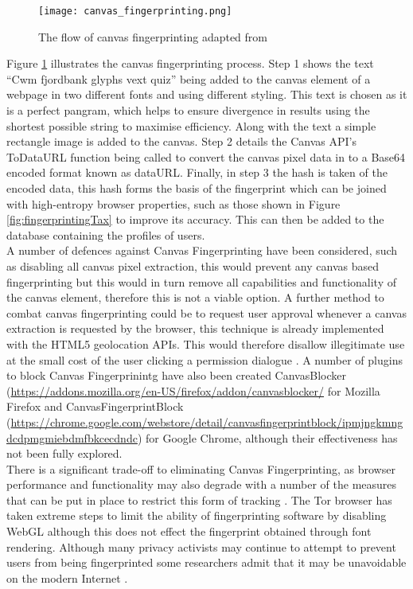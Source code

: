 \documentclass[12pt]{article}
\begin{document}
\begin{figure}[H]
    \centering
    \texttt{[image: canvas\_fingerprinting.png]}
    \caption{The flow of canvas fingerprinting adapted from \parencite{webNeverForgets}}
    \label{fig:canvas_fingerprinting}
\end{figure}

Figure \ref{fig:canvas_fingerprinting} illustrates the canvas fingerprinting process. Step 1 shows the text ``Cwm fjordbank glyphs vext quiz” being added to the canvas element of a webpage in two different fonts and using different styling. This text is chosen as it is a perfect pangram, which helps to ensure divergence in results using the shortest possible string to maximise efficiency. Along with the text a simple rectangle image is added to the canvas. Step 2 details the Canvas API’s ToDataURL function being called to convert the canvas pixel data in to a Base64 encoded format known as dataURL. Finally, in step 3 the hash is taken of the encoded data, this hash forms the basis of the fingerprint which can be joined with high-entropy browser properties, such as those shown in Figure \ref{fig:fingerprintingTax} to improve its accuracy. This can then be added to the database containing the profiles of users. \\     

A number of defences against Canvas Fingerprinting have been considered, such as disabling all canvas pixel extraction, this would prevent any canvas based fingerprinting but this would in turn remove all capabilities and functionality of the canvas element, therefore this is not a viable option. A further method to combat canvas fingerprinting could be to request user approval whenever a canvas extraction is requested by the browser, this technique is already implemented with the HTML5 geolocation APIs. This would therefore disallow illegitimate use at the small cost of the user clicking a permission dialogue \parencite{canvasFP}. A number of plugins to block Canvas Fingerprinintg have also been created CanvasBlocker (\url{https://addons.mozilla.org/en-US/firefox/addon/canvasblocker/} for Mozilla Firefox and CanvasFingerprintBlock (\url{https://chrome.google.com/webstore/detail/canvasfingerprintblock/ipmjngkmngdcdpmgmiebdmfbkcecdndc}) for Google Chrome, although their effectiveness has not been fully explored. \\  

There is a significant trade-off to eliminating Canvas Fingerprinting, as browser performance and functionality may also degrade with a number of the measures that can be put in place to restrict this form of tracking \parencite{canvasFP}. The Tor browser has taken extreme steps to limit the ability of fingerprinting software by disabling WebGL although this does not effect the fingerprint obtained through font rendering. Although many privacy activists may continue to attempt to prevent users from being fingerprinted some researchers admit that it may be unavoidable on the modern Internet \parencite{canvasFP}.
\end{document}
